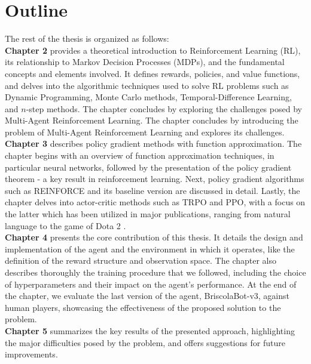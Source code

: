 \section{Outline}
The rest of the thesis is organized as follows:\\
\textbf{Chapter 2} provides a theoretical introduction to Reinforcement Learning (RL), its relationship to Markov Decision Processes (MDPs), and the fundamental concepts and elements involved. It defines rewards, policies, and value functions, and delves into the algorithmic techniques used to solve RL problems such as Dynamic Programming, Monte Carlo methods, Temporal-Difference Learning, and $n$-step methods. The chapter concludes by exploring the challenges posed by Multi-Agent Reinforcement Learning. The chapter concludes by introducing the problem of Multi-Agent Reinforcement Learning and explores its challenges.\\
\textbf{Chapter 3} describes policy gradient methods with function approximation. The chapter begins with an overview of function approximation techniques, in particular neural networks, followed by the presentation of the policy gradient theorem - a key result in reinforcement learning. Next, policy gradient algorithms such as REINFORCE and its baseline version are discussed in detail. Lastly, the chapter delves into actor-critic methods such as TRPO and PPO, with a focus on the latter which has been utilized in major publications, ranging from natural language \cite{instruct-gpt} to the game of Dota 2 \cite{open-ai-five}.\\
\textbf{Chapter 4} presents the core contribution of this thesis. It details the design and implementation of the agent and the environment in which it operates, like the definition of the reward structure and observation space. The chapter also describes thoroughly the training procedure that we followed, including the choice of hyperparameters and their impact on the agent's performance. At the end of the chapter, we evaluate the last version of the agent, BriscolaBot-v3, against human players, showcasing the effectiveness of the proposed solution to the problem.\\
\textbf{Chapter 5} summarizes the key results of the presented approach, highlighting the major difficulties posed by the problem, and offers suggestions for future improvements. 
